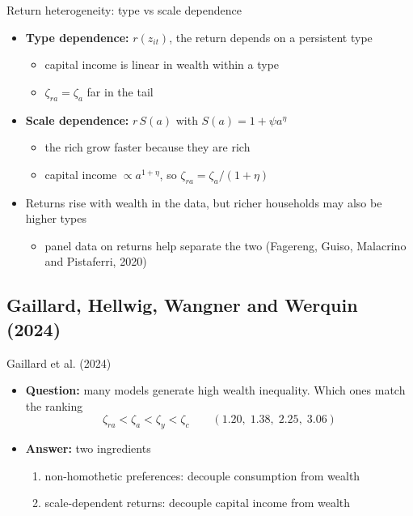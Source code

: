 \documentclass[10pt,english,10pt]{beamer}
\begin{document}
\begin{frame}{Return heterogeneity: type vs scale dependence}
\begin{itemize}
\item \textbf{Type dependence:} $r(z_{it})$, the return depends on a persistent type
\begin{itemize}
\item capital income is linear in wealth within a type
\item $\zeta_{ra}=\zeta_{a}$ far in the tail
\end{itemize}
\item \textbf{Scale dependence:} $r\,S(a)$ with $S(a)=1+\psi a^{\eta}$
\begin{itemize}
\item the rich grow faster because they are rich
\item capital income $\propto a^{1+\eta}$, so $\zeta_{ra}=\zeta_{a}/(1+\eta)$
\end{itemize}
\item Returns rise with wealth in the data, but richer households may also be higher types
\begin{itemize}
\item panel data on returns help separate the two (Fagereng, Guiso, Malacrino and Pistaferri, 2020)
\end{itemize}
\end{itemize}
\end{frame}

\subsection{Gaillard, Hellwig, Wangner and Werquin (2024)}

\begin{frame}{Gaillard et al. (2024)}
\begin{itemize}
\item \textbf{Question:} many models generate high wealth inequality. Which ones match the ranking
\[
\zeta_{ra}<\zeta_{a}<\zeta_{y}<\zeta_{c}\qquad(1.20,\;1.38,\;2.25,\;3.06)
\]
\item \textbf{Answer:} two ingredients
\begin{enumerate}
\item non-homothetic preferences: decouple consumption from wealth
\item scale-dependent returns: decouple capital income from wealth
\end{enumerate}
\end{itemize}
\end{frame}
\end{document}
